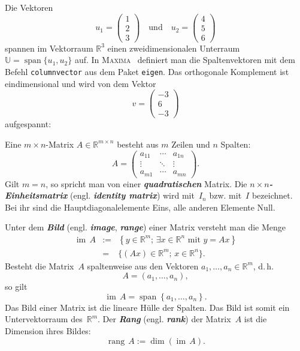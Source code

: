 \begin{example}
\label{exa:orthogonales-Komplement}Die Vektoren
\[
u_{1}=\left(\begin{array}{c}
1\\
2\\
3
\end{array}\right)\quad\text{und}\quad u_{2}=\left(\begin{array}{c}
4\\
5\\
6
\end{array}\right)
\]
spannen im Vektorraum ${\mathbb{R}}^{3}$ einen zweidimensionalen Unterraum
$\mathbb{U}={\operatorname{span}}\{u_{1},u_{2}\}$ auf. In \textsc{Maxima}~\cite{maxima,haager2014}
definiert man die Spaltenvektoren mit dem Befehl \texttt{columnvector}
aus dem Paket \texttt{eigen}. Das orthogonale Komplement ist eindimensional
und wird von dem Vektor
\[
v=\left(\begin{array}{c}
-3\\
6\\
-3
\end{array}\right)
\]
aufgespannt:


\end{example}

Eine $m\times n$-Matrix $A\in{\mathbb{R}}^{m\times n}$ besteht aus $m$ Zeilen
und $n$ Spalten:
\[
A=\left(\begin{array}{ccc}
a_{11} & \cdots & a_{1n}\\
\vdots & \ddots & \vdots\\
a_{m1} & \cdots & a_{mn}
\end{array}\right).
\]
Gilt $m=n$, so spricht man von einer \textbf{\em quadratischen} Matrix.
Die $n\times n$\textbf{\em -Einheitsmatrix} (engl. \textbf{\em identity matrix})
wird mit~$I_{n}$ bzw. mit~$I$ bezeichnet. Bei ihr sind die Hauptdiagonalelemente
Eins, alle anderen Elemente Null.

Unter dem \textbf{\em Bild} (engl. \textbf{\em image}, \textbf{\em range}) einer Matrix
versteht man die Menge
\[
\begin{array}{lrl}
{\operatorname{im}}\,A & := & \left\{ y\in{\mathbb{R}}^{m};\,\exists x\in{\mathbb{R}}^{n}\textrm{ mit }y=Ax\right\} \\
 & = & \{(Ax)\in{\mathbb{R}}^{m};\,x\in{\mathbb{R}}^{n}\}.
\end{array}
\]
 Besteht die Matrix~$A$ spaltenweise aus den Vektoren $a_{1},\ldots,a_{n}\in{\mathbb{R}}^{m}$,
d.\,h.
\[
A=\left(a_{1},\ldots,a_{n}\right),
\]
so gilt
\[
{\operatorname{im}}\,A={\operatorname{span}}\left\{ a_{1},\ldots,a_{n}\right\} .
\]
Das Bild einer Matrix ist die lineare Hülle der Spalten. Das Bild
ist somit ein Untervektorraum des~${\mathbb{R}}^{m}$. Der \textbf{\em Rang} (engl.
\textbf{\em rank}) der Matrix~$A$ ist die Dimension ihres Bildes:
\begin{equation}
{\operatorname{rang}}\,A:=\dim({\operatorname{im}}\,A).\label{eq:rank}
\end{equation}

